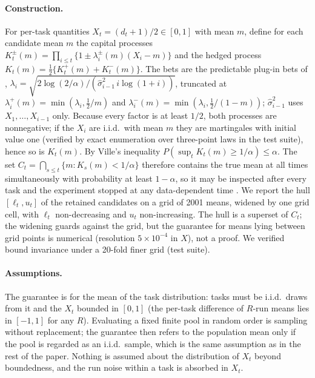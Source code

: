 \paragraph{Construction.} For per-task quantities $X_t=(d_t+1)/2\in[0,1]$ with mean $m$, define for each candidate mean $m$ the capital processes $K^{\pm}_t(m)=\prod_{i\le t}\{1\pm\lambda_i^{\pm}(m)(X_i-m)\}$ and the hedged process $K_t(m)=\frac12\{K^+_t(m)+K^-_t(m)\}$. The bets are the predictable plug-in bets of \citet{waudbysmith2024betting}, $\lambda_i=\sqrt{2\log(2/\alpha)/(\hat\sigma^2_{i-1}\,i\log(1+i))}$, truncated at $\lambda_i^+(m)=\min(\lambda_i,\frac12/m)$ and $\lambda_i^-(m)=\min(\lambda_i,\frac12/(1-m))$; $\hat\sigma^2_{i-1}$ uses $X_1,\dots,X_{i-1}$ only. Because every factor is at least $1/2$, both processes are nonnegative; if the $X_i$ are i.i.d.\ with mean $m$ they are martingales with initial value one (verified by exact enumeration over three-point laws in the test suite), hence so is $K_t(m)$. By Ville's inequality $P(\sup_t K_t(m)\ge 1/\alpha)\le\alpha$. The set $C_t=\bigcap_{s\le t}\{m:K_s(m)<1/\alpha\}$ therefore contains the true mean at all times simultaneously with probability at least $1-\alpha$, so it may be inspected after every task and the experiment stopped at any data-dependent time \citep{howard2021cs,ramdas2023gametheoretic}. We report the hull $[\ell_t,u_t]$ of the retained candidates on a grid of 2001 means, widened by one grid cell, with $\ell_t$ non-decreasing and $u_t$ non-increasing. The hull is a superset of $C_t$; the widening guards against the grid, but the guarantee for means lying between grid points is numerical (resolution $5\times10^{-4}$ in $X$), not a proof. We verified bound invariance under a 20-fold finer grid (test suite).

\paragraph{Assumptions.} The guarantee is for the mean of the task distribution: tasks must be i.i.d.\ draws from it and the $X_t$ bounded in $[0,1]$ (the per-task difference of $R$-run means lies in $[-1,1]$ for any $R$). Evaluating a fixed finite pool in random order is sampling without replacement; the guarantee then refers to the population mean only if the pool is regarded as an i.i.d.\ sample, which is the same assumption as in the rest of the paper. Nothing is assumed about the distribution of $X_t$ beyond boundedness, and the run noise within a task is absorbed in $X_t$.


